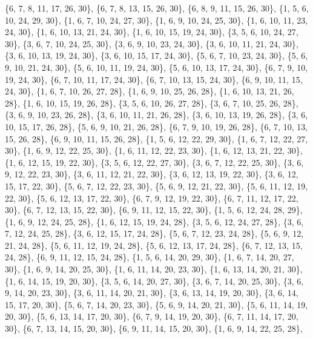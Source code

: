 \documentclass[11pt,a4paper]{article}
\begin{document}
{\{6, 7, 8, 11, 17, 26, 30\}, \{6, 7, 8, 13, 15, 26, 30\}, \{6, 8, 9, 11, 15, 26, 30\}, \{1, 5, 6, 10, 24, 29, 30\}, \{1, 6, 7, 10, 24, 27, 30\},
\{1, 6, 9, 10, 24, 25, 30\}, \{1, 6, 10, 11, 23, 24, 30\}, \{1, 6, 10, 13, 21, 24, 30\}, \{1, 6, 10, 15, 19, 24, 30\}, \{3, 5, 6, 10, 24, 27, 30\},
\{3, 6, 7, 10, 24, 25, 30\}, \{3, 6, 9, 10, 23, 24, 30\}, \{3, 6, 10, 11, 21, 24, 30\}, \{3, 6, 10, 13, 19, 24, 30\}, \{3, 6, 10, 15, 17, 24, 30\},
\{5, 6, 7, 10, 23, 24, 30\}, \{5, 6, 9, 10, 21, 24, 30\}, \{5, 6, 10, 11, 19, 24, 30\}, \{5, 6, 10, 13, 17, 24, 30\}, \{6, 7, 9, 10, 19, 24, 30\},
\{6, 7, 10, 11, 17, 24, 30\}, \{6, 7, 10, 13, 15, 24, 30\}, \{6, 9, 10, 11, 15, 24, 30\}, \{1, 6, 7, 10, 26, 27, 28\}, \{1, 6, 9, 10, 25, 26, 28\},
\{1, 6, 10, 13, 21, 26, 28\}, \{1, 6, 10, 15, 19, 26, 28\}, \{3, 5, 6, 10, 26, 27, 28\}, \{3, 6, 7, 10, 25, 26, 28\}, \{3, 6, 9, 10, 23, 26, 28\},
\{3, 6, 10, 11, 21, 26, 28\}, \{3, 6, 10, 13, 19, 26, 28\}, \{3, 6, 10, 15, 17, 26, 28\}, \{5, 6, 9, 10, 21, 26, 28\}, \{6, 7, 9, 10, 19, 26, 28\},
\{6, 7, 10, 13, 15, 26, 28\}, \{6, 9, 10, 11, 15, 26, 28\}, \{1, 5, 6, 12, 22, 29, 30\}, \{1, 6, 7, 12, 22, 27, 30\}, \{1, 6, 9, 12, 22, 25, 30\},
\{1, 6, 11, 12, 22, 23, 30\}, \{1, 6, 12, 13, 21, 22, 30\}, \{1, 6, 12, 15, 19, 22, 30\}, \{3, 5, 6, 12, 22, 27, 30\}, \{3, 6, 7, 12, 22, 25, 30\},
\{3, 6, 9, 12, 22, 23, 30\}, \{3, 6, 11, 12, 21, 22, 30\}, \{3, 6, 12, 13, 19, 22, 30\}, \{3, 6, 12, 15, 17, 22, 30\}, \{5, 6, 7, 12, 22, 23, 30\},
\{5, 6, 9, 12, 21, 22, 30\}, \{5, 6, 11, 12, 19, 22, 30\}, \{5, 6, 12, 13, 17, 22, 30\}, \{6, 7, 9, 12, 19, 22, 30\}, \{6, 7, 11, 12, 17, 22, 30\},
\{6, 7, 12, 13, 15, 22, 30\}, \{6, 9, 11, 12, 15, 22, 30\}, \{1, 5, 6, 12, 24, 28, 29\}, \{1, 6, 9, 12, 24, 25, 28\}, \{1, 6, 12, 15, 19, 24, 28\},
\{3, 5, 6, 12, 24, 27, 28\}, \{3, 6, 7, 12, 24, 25, 28\}, \{3, 6, 12, 15, 17, 24, 28\}, \{5, 6, 7, 12, 23, 24, 28\}, \{5, 6, 9, 12, 21, 24, 28\},
\{5, 6, 11, 12, 19, 24, 28\}, \{5, 6, 12, 13, 17, 24, 28\}, \{6, 7, 12, 13, 15, 24, 28\}, \{6, 9, 11, 12, 15, 24, 28\}, \{1, 5, 6, 14, 20, 29, 30\},
\{1, 6, 7, 14, 20, 27, 30\}, \{1, 6, 9, 14, 20, 25, 30\}, \{1, 6, 11, 14, 20, 23, 30\}, \{1, 6, 13, 14, 20, 21, 30\}, \{1, 6, 14, 15, 19, 20, 30\},
\{3, 5, 6, 14, 20, 27, 30\}, \{3, 6, 7, 14, 20, 25, 30\}, \{3, 6, 9, 14, 20, 23, 30\}, \{3, 6, 11, 14, 20, 21, 30\}, \{3, 6, 13, 14, 19, 20, 30\},
\{3, 6, 14, 15, 17, 20, 30\}, \{5, 6, 7, 14, 20, 23, 30\}, \{5, 6, 9, 14, 20, 21, 30\}, \{5, 6, 11, 14, 19, 20, 30\}, \{5, 6, 13, 14, 17, 20, 30\},
\{6, 7, 9, 14, 19, 20, 30\}, \{6, 7, 11, 14, 17, 20, 30\}, \{6, 7, 13, 14, 15, 20, 30\}, \{6, 9, 11, 14, 15, 20, 30\}, \{1, 6, 9, 14, 22, 25, 28\},
}
\end{document}
